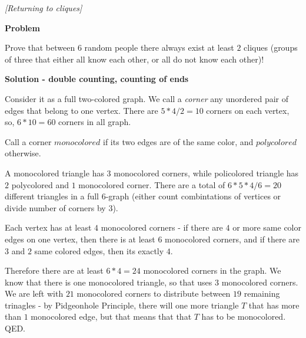 \begin{problem}
\textit{[Returning to cliques]}

\textbf{Problem}

Prove that between $6$ random people there always exist at least $2$ cliques (groups of three that either all know each other, or all do not know each other)!

\textbf{Solution - double counting, counting of ends}

Consider it as a full two-colored graph.
We call a \textit{corner} any unordered pair of edges that belong to one vertex. There are $5*4/2=10$ corners on each vertex, so, $6*10=60$ corners in all graph.

Call a corner $monocolored$ if its two edges are of the same color, and $polycolored$ otherwise.

A monocolored triangle has $3$ monocolored corners, while policolored triangle has $2$ polycolored and $1$ monocolored corner. There are a total of $6*5*4/6=20$ different triangles in a full $6$-graph (either count combintations of vertices or divide number of corners by $3$).

Each vertex has at least $4$ monocolored corners - if there are $4$ or more same color edges on one vertex, then there is at least $6$ monocolored corners, and if there are $3$ and $2$ same colored edges, then its exactly $4$. 

Therefore there are at least $6*4=24$ monocolored corners in the graph. We know that there is one monocolored triangle, so that uses $3$ monocolored corners. We are left with $21$ monocolored corners to distribute between $19$ remaining trinagles - by Pidgeonhole Principle, there will one more triangle $T$ that has more than $1$ monocolored edge, but that means that that $T$ has to be monocolored. QED.
\end{problem}
%


